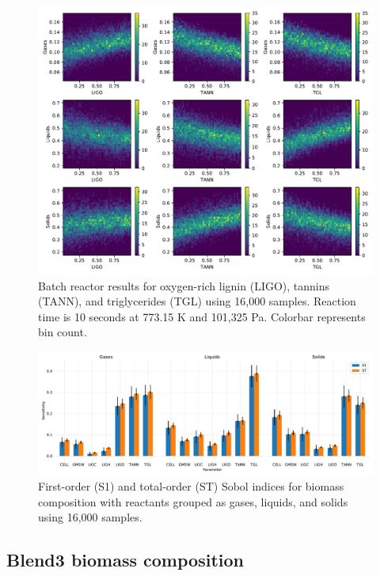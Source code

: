 \begin{figure}[H]
    \centering
    \includegraphics[width=\textwidth]{figures/sa-hexbin2-n1000.pdf}
    \caption{Batch reactor results for oxygen-rich lignin (LIGO), tannins (TANN), and triglycerides (TGL) using 16,000 samples. Reaction time is 10 seconds at 773.15 K and 101,325 Pa. Colorbar represents bin count.}
    \label{fig:batch-sa2}
\end{figure}

\begin{figure}[H]
    \centering
    \includegraphics[width=\textwidth]{figures/sa-bar-n1000.pdf}
    \caption{First-order (S1) and total-order (ST) Sobol indices for biomass composition with reactants grouped as gases, liquids, and solids using 16,000 samples.}
    \label{fig:batch-sa3}
\end{figure}

\subsection{Blend3 biomass composition}

